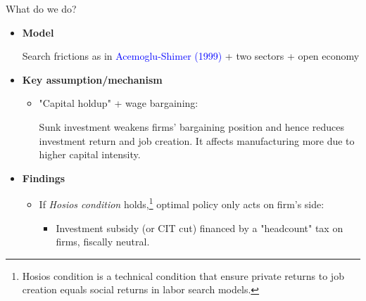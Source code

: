 \documentclass[9pt,xcolor={svgnames}]{beamer}
\begin{document}
\begin{frame}{What do we do?}\label{main:summary1}
\begin{itemize}

  \item \textbf{Model}

  Search frictions as in \textcolor{blue}{Acemoglu-Shimer (1999)} + two sectors + open economy 

\vspace{2mm}

\item \textbf{Key assumption/mechanism}

\begin{itemize}
    \item "Capital holdup" + wage bargaining: 
    
    Sunk investment  weakens firms' bargaining position and hence reduces investment return and job creation.
    It affects manufacturing more due to higher capital intensity. 
\end{itemize}

\vspace{2mm}

  \item \textbf{Findings}
    \begin{itemize}
      \item If \textit{Hosios condition} holds,\footnote{Hosios condition is a technical condition that ensure private returns to job creation equals social returns in labor search models.} optimal policy only acts on firm's side:
      \begin{itemize}
          
          \item Investment subsidy (or CIT cut) financed by a "headcount" tax on firms, {fiscally neutral}. %
      \end{itemize}


\end{itemize}
\end{itemize}
\end{frame}
\end{document}
